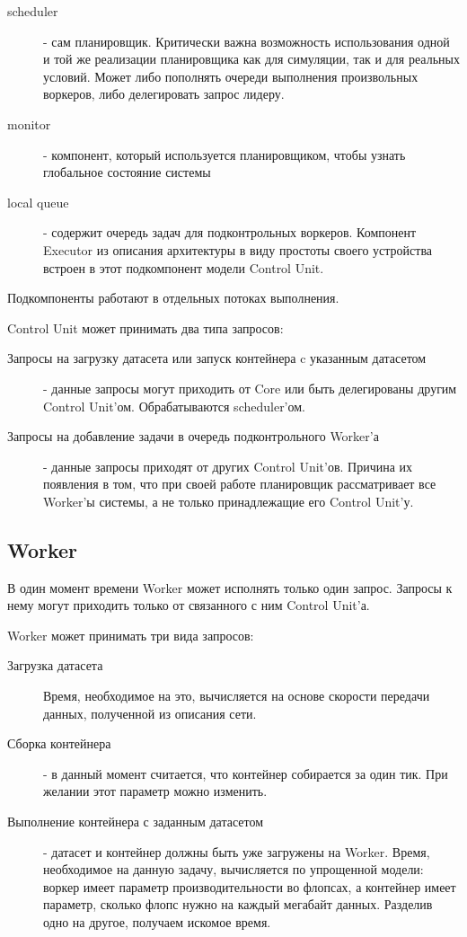 \begin{description}
	\item[scheduler] - сам планировщик. Критически важна возможность использования одной и той же реализации планировщика как для симуляции, так и для реальных условий. Может либо пополнять очереди выполнения произвольных воркеров, либо делегировать запрос лидеру.
	\item[monitor] - компонент, который используется планировщиком, чтобы узнать глобальное состояние системы
	\item[local queue] - содержит очередь задач для подконтрольных воркеров. Компонент Executor из описания архитектуры в виду простоты своего устройства встроен в этот подкомпонент модели Control Unit.
\end{description}

Подкомпоненты работают в отдельных потоках выполнения.

Control Unit может принимать два типа запросов:

\begin{description}
	\item[Запросы на загрузку датасета или запуск контейнера c указанным датасетом] - данные запросы могут приходить от Core или быть делегированы другим Control Unit'ом. Обрабатываются scheduler'ом.
	\item[Запросы на добавление задачи в очередь подконтрольного Worker'а] - данные запросы приходят от других Control Unit'ов. Причина их появления в том, что при своей работе планировщик рассматривает все Worker'ы системы, а не только принадлежащие его Control Unit'у.
\end{description}

\subsection{Worker}

В один момент времени Worker может исполнять только один запрос. Запросы к нему могут приходить только от связанного с ним Control Unit'а.

Worker может принимать три вида запросов:

\begin{description}
	\item[Загрузка датасета] Время, необходимое на это, вычисляется на основе скорости передачи данных, полученной из описания сети.
	\item[Сборка контейнера] - в данный момент считается, что контейнер собирается за один тик. При желании этот параметр можно изменить.
	\item[Выполнение контейнера с заданным датасетом] - датасет и контейнер должны быть уже загружены на Worker. Время, необходимое на данную задачу, вычисляется по упрощенной модели: воркер имеет параметр производительности во флопсах, а контейнер имеет параметр, сколько флопс нужно на каждый мегабайт данных. Разделив одно на другое, получаем искомое время.
\end{description}